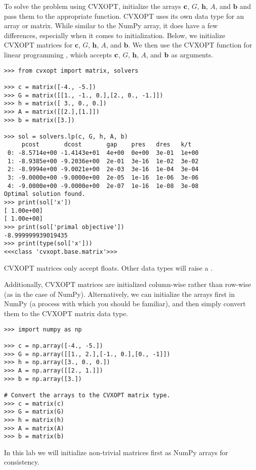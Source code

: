 To solve the problem using CVXOPT, initialize the arrays $\mathbf{c}$, $G$, $\mathbf{h}$, $A$, and $\mathbf{b}$ and pass them to the appropriate function.
CVXOPT uses its own data type for an array or matrix. 
While similar to the NumPy array, it does have a few differences, especially when it comes to initialization.
Below, we initialize CVXOPT matrices for $\mathbf{c}$, $G$, $\mathbf{h}$, $A$, and $\mathbf{b}$.
We then use the CVXOPT function for linear programming , which accepts $\mathbf{c}$, $G$, $\mathbf{h}$, $A$, and $\mathbf{b}$ as arguments.

\begin{lstlisting}
>>> from cvxopt import matrix, solvers

>>> c = matrix([-4., -5.])
>>> G = matrix([[1., -1., 0.],[2., 0., -1.]])
>>> h = matrix([ 3., 0., 0.])
>>> A = matrix([[2.],[1.]])
>>> b = matrix([3.])

>>> sol = solvers.lp(c, G, h, A, b)
     pcost       dcost       gap    pres   dres   k/t
 0: -8.5714e+00 -1.4143e+01  4e+00  0e+00  3e-01  1e+00
 1: -8.9385e+00 -9.2036e+00  2e-01  3e-16  1e-02  3e-02
 2: -8.9994e+00 -9.0021e+00  2e-03  3e-16  1e-04  3e-04
 3: -9.0000e+00 -9.0000e+00  2e-05  1e-16  1e-06  3e-06
 4: -9.0000e+00 -9.0000e+00  2e-07  1e-16  1e-08  3e-08
Optimal solution found.
>>> print(sol['x'])
[ 1.00e+00]
[ 1.00e+00]
>>> print(sol['primal objective'])
-8.999999939019435
>>> print(type(sol['x']))
<<<class 'cvxopt.base.matrix'>>>
\end{lstlisting}

\begin{warn}
CVXOPT matrices only accept floats. 
Other data types will raise a .

Additionally, CVXOPT matrices are initialized column-wise rather than row-wise (as in the case of NumPy).
Alternatively, we can initialize the arrays first in NumPy (a process with which you should be familiar),
and then simply convert them to the CVXOPT matrix data type.
\begin{lstlisting}
>>> import numpy as np

>>> c = np.array([-4., -5.])
>>> G = np.array([[1., 2.],[-1., 0.],[0., -1]])
>>> h = np.array([3., 0., 0.])
>>> A = np.array([[2., 1.]])
>>> b = np.array([3.])

# Convert the arrays to the CVXOPT matrix type.
>>> c = matrix(c)
>>> G = matrix(G)
>>> h = matrix(h)
>>> A = matrix(A)
>>> b = matrix(b)
\end{lstlisting}
In this lab we will initialize non-trivial matrices first as NumPy arrays for consistency.

\end{warn}

